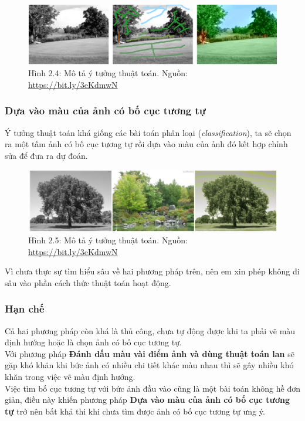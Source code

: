 \documentclass[a4paper]{article}
\begin{document}
\begin{figure}[h!]
\centering
\includegraphics[width=15cm]{images/2_4.png}
\caption{Hình 2.4: Mô tả ý tưởng thuật toán. Nguồn: \href{https://bit.ly/3eKdmwN}{https://bit.ly/3eKdmwN}}
\end{figure}

\subsubsection{Dựa vào màu của ảnh có bố cục tương tự}
Ý tưởng thuật toán khá giống các bài toán phân loại (\textit{classification}), ta sẽ chọn ra một tấm ảnh có bố cục tương tự rồi dựa vào màu của ảnh đó kết hợp chỉnh sửa để đưa ra dự đoán.

\begin{figure}[h!]
\centering
\includegraphics[width=15cm]{images/2_5.png}
\caption{Hình 2.5: Mô tả ý tưởng thuật toán. Nguồn: \href{https://bit.ly/3eKdmwN}{https://bit.ly/3eKdmwN}}
\end{figure}

\noindent
Vì chưa thực sự tìm hiểu sâu về hai phương pháp trên, nên em xin phép không đi sâu vào phần cách thức thuật toán hoạt động.

\subsubsection{Hạn chế}
Cả hai phương pháp còn khá là thủ công, chưa tự động được khi ta phải vẽ màu định hướng hoặc là chọn ảnh có bố cục tương tự.\\
Với phương pháp \textbf{Đánh dấu màu vài điểm ảnh và dùng thuật toán lan} sẽ gặp khó khăn khi bức ảnh có nhiều chi tiết khác màu nhau thì sẽ gây nhiều khó khăn trong việc vẽ màu định hướng.\\
Việc tìm bố cục tương tự với bức ảnh đầu vào cũng là một bài toán không hề đơn giản, điều này khiến phương pháp \textbf{Dựa vào màu của ảnh có bố cục tương tự} trở nên bất khả thi khi chưa tìm được ảnh có bố cục tương tự ưng ý.
\end{document}
